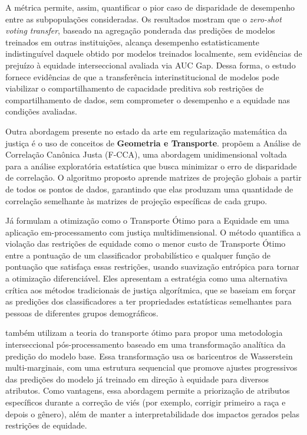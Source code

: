 A métrica permite, assim, quantificar o pior caso de disparidade de desempenho entre as subpopulações consideradas. Os resultados mostram que o \textit{zero-shot voting transfer}, baseado na agregação ponderada das predições de modelos treinados em outras instituições, alcança desempenho estatisticamente indistinguível daquele obtido por modelos treinados localmente, sem evidências de prejuízo à equidade interseccional avaliada via AUC Gap. Dessa forma, o estudo fornece evidências de que a transferência interinstitucional de modelos pode viabilizar o compartilhamento de capacidade preditiva sob restrições de compartilhamento de dados, sem comprometer o desempenho e a equidade nas condições avaliadas.

Outra abordagem presente no estado da arte em regularização matemática da justiça é o uso de conceitos de \textbf{Geometria e Transporte}.  \citet{zhou2023fair} propõem a Análise de Correlação Canônica Justa (F-CCA), uma abordagem unidimensional voltada para a análise exploratória estatística que busca minimizar o erro de disparidade de correlação. O algoritmo proposto aprende matrizes de projeção globais a partir de todos os pontos de dados, garantindo que elas produzam uma quantidade de correlação semelhante às matrizes de projeção específicas de cada grupo.

Já \citet{buyl2022optimal} formulam a otimização como o Transporte Ótimo para a Equidade em uma aplicação em-processamento com justiça multidimensional. O método quantifica a violação das restrições de equidade como o menor custo de Transporte Ótimo entre a pontuação de um classificador probabilístico e qualquer função de pontuação que satisfaça essas restrições, usando suavização entrópica para tornar a otimização diferenciável. Eles apresentam a estratégia como uma alternativa crítica aos métodos tradicionais de justiça algorítmica, que se baseiam em forçar as predições dos classificadores a ter propriedades estatísticas semelhantes para pessoas de diferentes grupos demográficos.

\citet{hu2024sequentially} também utilizam a teoria do transporte ótimo para propor uma metodologia interseccional pós-processamento baseado em uma transformação analítica da predição do modelo base. Essa transformação usa os baricentros de Wasserstein multi-marginais, com uma estrutura sequencial que promove ajustes progressivos das predições do modelo já treinado em direção à equidade para diversos atributos. Como vantagens, essa abordagem permite a priorização de atributos específicos durante a correção de viés (por exemplo, corrigir primeiro a raça e depois o gênero), além de manter a interpretabilidade dos impactos gerados pelas restrições de equidade.

